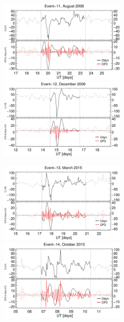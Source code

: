 \documentclass[a4paper,fleqn]{cas-dc}
\begin{document}
\begin{figure}[h!]
    \centering
    \centerline{\Large \bf   
         \hfill}
          \centerline{\Large \bf   
      \hspace{0.26\textwidth}  \color{black}{}
       \hspace{0.31\textwidth}  \color{black}{}
         \hfill}
     \includegraphics[width=6.0cm]{images/diono/iono_PI_V1_2006-08-17.eps}
     \includegraphics[width=6.0cm]{images/diono/iono_PI_V1_2006-12-12.eps}
     \centerline{\Large \bf   
      \hspace{0.275\textwidth}  \color{black}{}
       \hspace{0.295\textwidth}  \color{black}{}
         \hfill}
     \includegraphics[width=6.0cm]{images/diono/iono_PI_V1_2015-03-15.eps}     
     \includegraphics[width=6.0cm]{images/diono/iono_PI_V1_2015-10-05.eps}

\end{figure}
\end{document}

